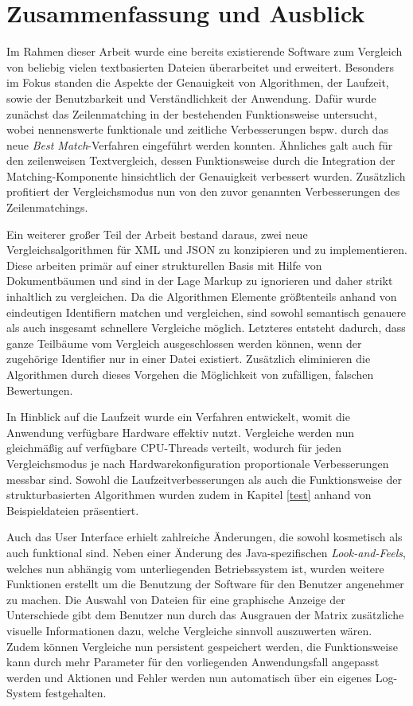 \section{Zusammenfassung und Ausblick}

Im Rahmen dieser Arbeit wurde eine bereits existierende Software zum Vergleich von beliebig vielen textbasierten Dateien überarbeitet und erweitert. Besonders im Fokus standen die Aspekte der Genauigkeit von Algorithmen, der Laufzeit, sowie der Benutzbarkeit und Verständlichkeit der Anwendung. Dafür wurde zunächst das Zeilenmatching in der bestehenden Funktionsweise untersucht, wobei nennenswerte funktionale und zeitliche Verbesserungen bspw. durch das neue \emph{Best Match}-Verfahren eingeführt werden konnten. Ähnliches galt auch für den zeilenweisen Textvergleich, dessen Funktionsweise durch die Integration der Matching-Komponente hinsichtlich der Genauigkeit verbessert wurden. Zusätzlich profitiert der Vergleichsmodus nun von den zuvor genannten Verbesserungen des Zeilenmatchings. 

Ein weiterer großer Teil der Arbeit bestand daraus, zwei neue Vergleichsalgorithmen für XML und JSON zu konzipieren und zu implementieren. Diese arbeiten primär auf einer strukturellen Basis mit Hilfe von Dokumentbäumen und sind in der Lage Markup zu ignorieren und daher strikt inhaltlich zu vergleichen. Da die Algorithmen Elemente größtenteils anhand von eindeutigen Identifiern matchen und vergleichen, sind sowohl semantisch genauere als auch insgesamt schnellere Vergleiche möglich. Letzteres entsteht dadurch, dass ganze Teilbäume vom Vergleich ausgeschlossen werden können, wenn der zugehörige Identifier nur in einer Datei existiert. Zusätzlich eliminieren die Algorithmen durch dieses Vorgehen die Möglichkeit von zufälligen, falschen Bewertungen.

In Hinblick auf die Laufzeit wurde ein Verfahren entwickelt, womit die Anwendung verfügbare Hardware effektiv nutzt. Vergleiche werden nun gleichmäßig auf verfügbare CPU-Threads verteilt, wodurch für jeden Vergleichsmodus je nach Hardwarekonfiguration proportionale Verbesserungen messbar sind. Sowohl die Laufzeitverbesserungen als auch die Funktionsweise der strukturbasierten Algorithmen wurden zudem in Kapitel \ref{test} anhand von Beispieldateien präsentiert.

Auch das User Interface erhielt zahlreiche Änderungen, die sowohl kosmetisch als auch funktional sind. Neben einer Änderung des Java-spezifischen \emph{Look-and-Feels}, welches nun abhängig vom unterliegenden Betriebssystem ist, wurden weitere Funktionen erstellt um die Benutzung der Software für den Benutzer angenehmer zu machen. Die Auswahl von Dateien für eine graphische Anzeige der Unterschiede gibt dem Benutzer nun durch das Ausgrauen der Matrix zusätzliche visuelle Informationen dazu, welche Vergleiche sinnvoll auszuwerten wären. Zudem können Vergleiche nun persistent gespeichert werden, die Funktionsweise kann durch mehr Parameter für den vorliegenden Anwendungsfall angepasst werden und Aktionen und Fehler werden nun automatisch über ein eigenes Log-System festgehalten.

